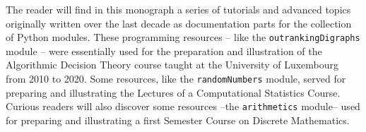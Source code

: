 %
%

\preface






The reader will find in this monograph a series of tutorials and advanced topics originally written over the last decade as documentation parts for the \Digraph collection of Python modules. These programming resources -- like the \texttt{outrankingDigraphs} module -- were essentially used for the preparation and illustration of the Algorithmic Decision Theory course taught at the University of Luxembourg from 2010 to 2020. Some resources, like the \texttt{randomNumbers} module, served for preparing and illustrating the Lectures of a Computational Statistics Course. Curious readers will also discover some resources --the \texttt{arithmetics} module-- used for preparing and illustrating a first Semester Course on Discrete Mathematics.


